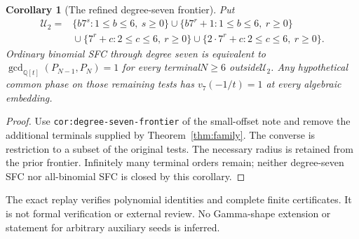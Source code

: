 \documentclass[11pt]{article}
\newtheorem{corollary}[lemma]{Corollary}
\begin{document}
\begin{corollary}[The refined degree-seven frontier]
\label{cor:degree-seven-frontier}
Put
\[
\begin{aligned}
 \mathcal U_2={}&\{b7^s:1\le b\le6,\ s\ge0\}
 \cup\{b7^r+1:1\le b\le6,\ r\ge0\}\\
 &{}\cup\{7^r+c:2\le c\le6,\ r\ge0\}
 \cup\{2\cdot7^r+c:2\le c\le6,\ r\ge0\}.
\end{aligned}
\]
Ordinary binomial SFC through degree seven is equivalent to
$\gcd_{\mathbb Q[t]}(P_{N-1},P_N)=1$ for every terminal$N\ge6$
outside$\mathcal U_2$.
Any hypothetical common phase on those remaining tests has
$v_7(-1/t)=1$ at every algebraic embedding.
\end{corollary}
\begin{proof}
Use \texttt{cor:degree-seven-frontier} of the small-offset note
and remove the additional terminals supplied by
Theorem~\ref{thm:family}.
The converse is restriction to a subset of the original tests.
The necessary radius is retained from the prior frontier.
Infinitely many terminal orders remain; neither degree-seven
SFC nor all-binomial SFC is closed by this corollary.
\end{proof}

The exact replay verifies polynomial identities and complete
finite certificates. It is not formal verification or external review.
No Gamma-shape extension or statement for arbitrary auxiliary seeds
is inferred.
\end{document}
